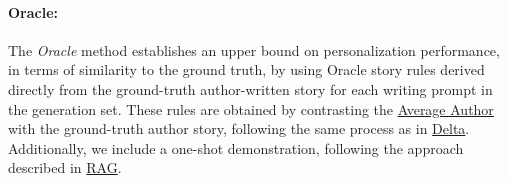 \paragraph{Oracle:}
\hypertarget{sec:oracle}{}

The \emph{Oracle} method establishes an upper bound on personalization performance, in terms of similarity to the ground truth, by using Oracle story rules derived directly from the ground-truth author-written story for each writing prompt in the generation set. These rules are obtained by contrasting the \hyperlink{sec:avg-author}{Average Author} with the ground-truth author story, following the same process as in \hyperlink{sec:delta}{Delta}. Additionally, we include a one-shot demonstration, following the approach described in \hyperlink{sec:rag}{RAG}.